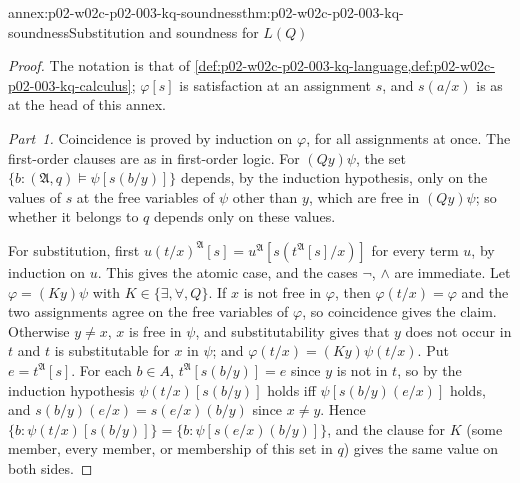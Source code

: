 \begin{annexitem}{annex:p02-w02c-p02-003-kq-soundness}{thm:p02-w02c-p02-003-kq-soundness}{Substitution and soundness for \(L(Q)\)}
\begin{proof}
The notation is that of
\cref{def:p02-w02c-p02-003-kq-language,def:p02-w02c-p02-003-kq-calculus};
\(\varphi[s]\) is satisfaction at an assignment \(s\), and \(s(a/x)\) is as
at the head of this annex.

\emph{Part~1.}  Coincidence is proved by induction on \(\varphi\), for all
assignments at once.  The first-order clauses are as in first-order logic.
For \((Qy)\psi\), the set \(\{b:(\mathfrak A,q)\models\psi[s(b/y)]\}\)
depends, by the induction hypothesis, only on the values of \(s\) at the
free variables of \(\psi\) other than \(y\), which are free in
\((Qy)\psi\); so whether it belongs to \(q\) depends only on these values.

For substitution, first \(u(t/x)^{\mathfrak A}[s]=
u^{\mathfrak A}[s(t^{\mathfrak A}[s]/x)]\) for every term \(u\), by
induction on \(u\).  This gives the atomic case, and the cases \(\neg\),
\(\land\) are immediate.  Let \(\varphi=(Ky)\psi\) with
\(K\in\{\exists,\forall,Q\}\).  If \(x\) is not free in \(\varphi\), then
\(\varphi(t/x)=\varphi\) and the two assignments agree on the free variables
of \(\varphi\), so coincidence gives the claim.  Otherwise \(y\neq x\),
\(x\) is free in \(\psi\), and substitutability gives that \(y\) does not
occur in \(t\) and \(t\) is substitutable for \(x\) in \(\psi\); and
\(\varphi(t/x)=(Ky)\psi(t/x)\).  Put \(e=t^{\mathfrak A}[s]\).  For each
\(b\in A\), \(t^{\mathfrak A}[s(b/y)]=e\) since \(y\) is not in \(t\), so by
the induction hypothesis \(\psi(t/x)[s(b/y)]\) holds iff
\(\psi[s(b/y)(e/x)]\) holds, and \(s(b/y)(e/x)=s(e/x)(b/y)\) since
\(x\neq y\).  Hence
\(\{b:\psi(t/x)[s(b/y)]\}=\{b:\psi[s(e/x)(b/y)]\}\), and the clause for
\(K\) (some member, every member, or membership of this set in \(q\)) gives
the same value on both sides.


\end{proof}
\end{annexitem}
